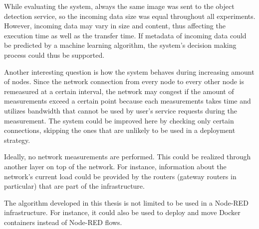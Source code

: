 While evaluating the system, always the same image was sent to the object detection service, so the incoming data size was equal throughout all experiments.
However, incoming data may vary in size and content, thus affecting the execution time as well as the transfer time.
If metadata of incoming data could be predicted by a machine learning algorithm, the system's decision making process could thus be supported.


Another interesting question is how the system behaves during increasing amount of nodes.
Since the network connection from every node to every other node is remeasured at a certain interval, the network may congest if the amount of measurements exceed a certain point because each measurements takes time and utilizes bandwidth that cannot be used by user's service requests during the measurement.
The system could be improved here by checking only certain connections, skipping the ones that are unlikely to be used in a deployment strategy.

Ideally, no network measurements are performed.
This could be realized through another layer on top of the network.
For instance, information about the network's current load could be provided by the routers (gateway routers in particular) that are part of the infrastructure.


The algorithm developed in this thesis is not limited to be used in a Node-RED infrastructure.
For instance, it could also be used to deploy and move Docker containers instead of Node-RED flows.